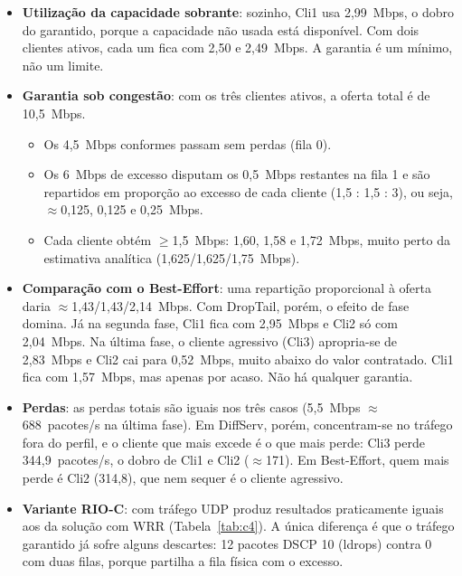 \IfFileExists{llncs.cls}{\documentclass[runningheads]{llncs}}{\documentclass{article}}
\newcommand{\esp}[1]{#1}
\begin{document}
\begin{itemize}
\item \textbf{Utilização da capacidade sobrante}: sozinho, Cli1 usa \esp{2,99~Mbps}, o dobro do
garantido, porque a capacidade não usada está disponível. Com dois clientes ativos, cada um
fica com \esp{2,50 e 2,49~Mbps}. A garantia é um mínimo, não um limite.
\item \textbf{Garantia sob congestão}: com os três clientes ativos, a oferta total é de
10,5~Mbps.
\begin{itemize}
\item Os 4,5~Mbps conformes passam sem perdas (fila 0).
\item Os 6~Mbps de excesso disputam os 0,5~Mbps restantes na fila 1 e são repartidos em
proporção ao excesso de cada cliente (1,5 : 1,5 : 3), ou seja, $\approx$0,125, 0,125 e 0,25~Mbps.
\item Cada cliente obtém \esp{$\ge$1,5~Mbps}: \esp{1,60, 1,58 e 1,72~Mbps}, muito perto
da estimativa analítica (1,625/1,625/1,75~Mbps).
\end{itemize}
\item \textbf{Comparação com o Best-Effort}: uma repartição proporcional à oferta daria $\approx$1,43/1,43/2,14~Mbps. Com DropTail, porém, o efeito de fase domina.
Já na segunda fase, Cli1 fica com \esp{2,95~Mbps} e Cli2 só com \esp{2,04~Mbps}. Na última
fase, o cliente agressivo (Cli3) apropria-se de \esp{2,83~Mbps} e Cli2 cai para
\esp{0,52~Mbps}, muito abaixo do valor contratado. Cli1 fica com \esp{1,57~Mbps}, mas apenas
por acaso. Não há qualquer garantia.
\item \textbf{Perdas}: as perdas totais são iguais nos três casos (5,5~Mbps $\approx$
\esp{688~pacotes/s} na última fase). Em DiffServ, porém, concentram-se no tráfego fora do
perfil, e o cliente que mais excede é o que mais perde: Cli3 perde \esp{344,9~pacotes/s},
o dobro de Cli1 e Cli2 (\esp{$\approx$171}). Em Best-Effort, quem mais perde é Cli2
(\esp{314,8}), que nem sequer é o cliente agressivo.
\item \textbf{Variante RIO-C}: com tráfego UDP produz resultados \esp{praticamente iguais}
aos da solução com WRR (Tabela~\ref{tab:c4}). A única diferença é que o tráfego garantido já
sofre alguns descartes: \esp{12 pacotes DSCP 10} (ldrops) contra 0 com duas filas, porque
partilha a fila física com o excesso.
\end{itemize}
\end{document}
